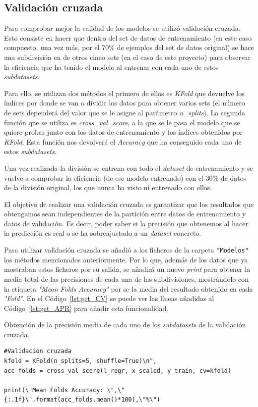 \documentclass[a4paper, 12pt]{book}
\begin{document}
\subsection{Validación cruzada}

Para comprobar mejor la calidad de los modelos se utilizó validación cruzada. Esto consiste en hacer que dentro del set de datos de entrenamiento (en este caso compuesto, una vez más, por el $70\%$ de ejemplos del set de datos original) se hace una subdivisión en de otros cinco sets (en el caso de este proyecto) para observar la eficiencia que ha tenido el modelo al entrenar con cada uno de estos \textit{subdatasets}. 

Para ello, se utilizan dos métodos el primero de ellos es \textit{KFold} que devuelve los índices por donde se van a dividir los datos para obtener varios sets (el número de sets dependerá del valor que se le asigne al parámetro \textit{n\_splits}). La segunda función que se utiliza es \textit{cross\_val\_score}, a la que se le pasa el modelo que se quiere probar junto con los datos de entrenamiento y los índices obtenidos por \textit{KFold}. Esta función nos devolverá el \textit{Accuracy} que ha conseguido cada uno de estos \textit{subdatasets}.

Una vez realizada la división se entrena con todo el \textit{dataset} de entrenamiento y se vuelve a comprobar la eficiencia (de ese modelo entrenado) con el $30\%$ de datos de la división original, los que nunca ha visto ni entrenado con ellos.

El objetivo de realizar una validación cruzada es garantizar que los resultados que obtengamos sean independientes de la partición entre datos de entrenamiento y datos de validación. Es decir, poder saber si la precisión que obtenemos al hacer la predicción es real o se ha sobreajustado a un \textit{dataset} concreto.
 
 Para utilizar validación cruzada se añadió a los ficheros de la carpeta \texttt{"Modelos"} los métodos mencionados anteriormente. Por lo que, además de los datos que ya mostraban estos ficheros por su salida, se añadirá un nuevo \textit{print} para obtener la media total de las precisiones de cada una de las subdivisiones, mostrándolo con la etiqueta \textit{"Mean Folds Accuracy"} por se la media del resultado obtenido en cada \textit{"Fold"}. En el Código~\ref{lst:get_CV} se puede ver las líneas añadidas al Código~\ref{lst:get_APR} para añadir esta funcionalidad.
 
 \begin{listing}[]
    \caption{Obtención de la precisión media de cada uno de los \textit{subdatasets} de la validación cruzada.}{}
    \label{lst:get_CV}
    \begin{verbatim}
#Validacion cruzada
kfold = KFold(n_splits=5, shuffle=True)\n",
acc_folds = cross_val_score(l_regr, x_scaled, y_train, cv=kfold)

print(\"Mean Folds Accuracy: \",\"{:.1f}\".format(acc_folds.mean()*100),\"%\")
    \end{verbatim}
\end{listing}
 
\end{document}
